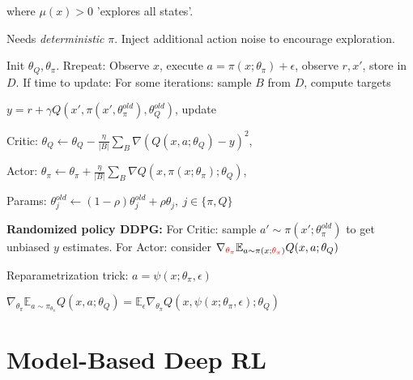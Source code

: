 where $\mu(x) > 0$ 'explores all states'. %



Needs \textit{deterministic} $\pi$. Inject additional action noise to encourage exploration.


Init $\theta_Q, \theta_\pi$. Rrepeat: Observe $x$, execute 
$a = \pi(x; \theta_\pi) + \epsilon$, observe $r,x'$, store in $D$.
If time to update: For some iterations: sample $B$ from $D$, compute targets

$y = r+ \gamma Q(x', \pi(x', \theta_\pi^{old}), \theta_Q^{old})$, update



\iftrue
Critic: $\theta_Q \leftarrow \theta_Q - \frac{\eta} {|B|} \sum_B\nabla (Q(x,a;\theta_Q) - y)^2$,

Actor: $\theta_\pi  \leftarrow \theta_\pi + \frac{\eta} {|B|} \sum_B \nabla Q(x, \pi(x; \theta_\pi); \theta_Q)$,

Params: $\theta_j^{old} \leftarrow (1 - \rho) \theta_j^{old} + \rho \theta_j,\ j \in \{\pi, Q \}$
\fi


\textbf{Randomized policy DDPG:} For Critic: sample $a' \sim \pi(x'; \theta_\pi^{old})$ to get unbiased $y$ estimates. For Actor: consider $\nabla_{\textcolor{red}{\theta_\pi}} \mathbb{E}_{a \sim \pi(x; \textcolor{red}{\theta_\pi})} Q(x,a;\theta_Q)$

Reparametrization trick: $a = \psi(x; \theta_\pi, \epsilon)$

$\nabla_{\theta_\pi} \mathbb{E}_{a \sim \pi_{\theta_\pi}} Q(x,a;\theta_Q) = \mathbb{E}_\epsilon \nabla_{\theta_\pi} Q(x, \psi(x; \theta_\pi, \epsilon); \theta_Q)$


\section{Model-Based Deep RL}



